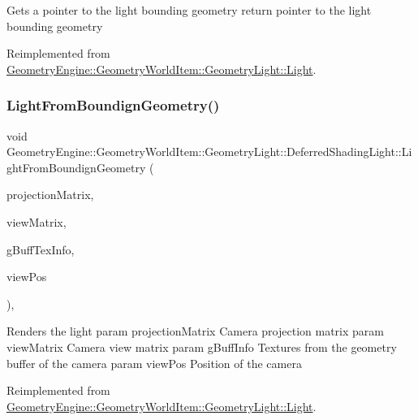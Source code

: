 Gets a pointer to the light bounding geometry return pointer to the light bounding geometry 

Reimplemented from \mbox{\hyperlink{class_geometry_engine_1_1_geometry_world_item_1_1_geometry_light_1_1_light_a53cc9a8e7ab6eab9d34f1655ef33eaef}{Geometry\+Engine\+::\+Geometry\+World\+Item\+::\+Geometry\+Light\+::\+Light}}.

\mbox{\label{class_geometry_engine_1_1_geometry_world_item_1_1_geometry_light_1_1_deferred_shading_light_a2071d92505a56dfb846b87c2aca9b94b}} 
\subsubsection{\texorpdfstring{LightFromBoundignGeometry()}{LightFromBoundignGeometry()}}
{\footnotesize\ttfamily void Geometry\+Engine\+::\+Geometry\+World\+Item\+::\+Geometry\+Light\+::\+Deferred\+Shading\+Light\+::\+Light\+From\+Boundign\+Geometry (\begin{DoxyParamCaption}\item[{const Q\+Matrix4x4 \&}]{projection\+Matrix,  }\item[{const Q\+Matrix4x4 \&}]{view\+Matrix,  }\item[{const \mbox{\hyperlink{class_geometry_engine_1_1_g_buffer_texture_info}{G\+Buffer\+Texture\+Info}} \&}]{g\+Buff\+Tex\+Info,  }\item[{const Q\+Vector3D \&}]{view\+Pos }\end{DoxyParamCaption})\hspace{0.3cm}{\ttfamily [override]}, {\ttfamily [virtual]}}

Renders the light param projection\+Matrix Camera projection matrix param view\+Matrix Camera view matrix param g\+Buff\+Info Textures from the geometry buffer of the camera param view\+Pos Position of the camera 

Reimplemented from \mbox{\hyperlink{class_geometry_engine_1_1_geometry_world_item_1_1_geometry_light_1_1_light_a4dfee4fc27c75493f992a84c2ea3ff95}{Geometry\+Engine\+::\+Geometry\+World\+Item\+::\+Geometry\+Light\+::\+Light}}.

